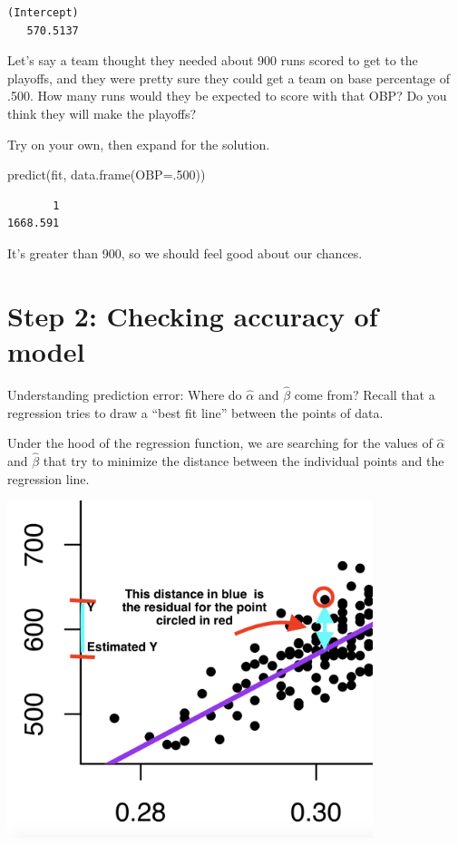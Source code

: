 \documentclass[
  letterpaper,
  DIV=11,
  numbers=noendperiod]{scrreprt}
\newenvironment{Shaded}{\begin{snugshade}}{\end{snugshade}}
\newcommand{\AttributeTok}[1]{\textcolor[rgb]{0.40,0.45,0.13}{#1}}
\newcommand{\DecValTok}[1]{\textcolor[rgb]{0.68,0.00,0.00}{#1}}
\newcommand{\FunctionTok}[1]{\textcolor[rgb]{0.28,0.35,0.67}{#1}}
\newcommand{\NormalTok}[1]{\textcolor[rgb]{0.00,0.23,0.31}{#1}}
\begin{document}
\begin{verbatim}
(Intercept) 
   570.5137 
\end{verbatim}

Let's say a team thought they needed about 900 runs scored to get to the
playoffs, and they were pretty sure they could get a team on base
percentage of .500. How many runs would they be expected to score with
that OBP? Do you think they will make the playoffs?

Try on your own, then expand for the solution.

\begin{Shaded}
\begin{Highlighting}[]
\FunctionTok{predict}\NormalTok{(fit, }\FunctionTok{data.frame}\NormalTok{(}\AttributeTok{OBP=}\NormalTok{.}\DecValTok{500}\NormalTok{))}
\end{Highlighting}
\end{Shaded}

\begin{verbatim}
       1 
1668.591 
\end{verbatim}

It's greater than 900, so we should feel good about our chances.

\hypertarget{step-2-checking-accuracy-of-model}{%
\section{Step 2: Checking accuracy of
model}\label{step-2-checking-accuracy-of-model}}

Understanding prediction error: Where do \(\hat \alpha\) and
\(\hat \beta\) come from? Recall that a regression tries to draw a
``best fit line'' between the points of data.

Under the hood of the regression function, we are searching for the
values of \(\hat \alpha\) and \(\hat \beta\) that try to minimize the
distance between the individual points and the regression line.

\includegraphics[width=0.8\textwidth,height=\textheight]{images/residual.png}
\end{document}
